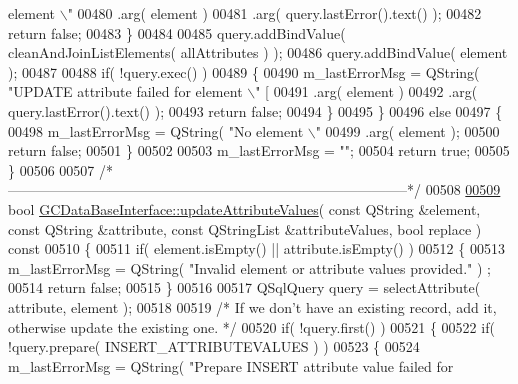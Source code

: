 \begin{DoxyCode}
{{{{{{{{{{{{{{{{{{{{       element \(\backslash\)"%
00480           .arg( element )
00481           .arg( query.lastError().text() );
00482       \textcolor{keywordflow}{return} \textcolor{keyword}{false};
00483     \}
00484 
00485     query.addBindValue( cleanAndJoinListElements( allAttributes ) );
00486     query.addBindValue( element );
00487 
00488     \textcolor{keywordflow}{if}( !query.exec() )
00489     \{
00490       m\_lastErrorMsg = QString( \textcolor{stringliteral}{"UPDATE attribute failed for element \(\backslash\)"%
       [%
00491           .arg( element )
00492           .arg( query.lastError().text() );
00493       \textcolor{keywordflow}{return} \textcolor{keyword}{false};
00494     \}
00495   \}
00496   \textcolor{keywordflow}{else}
00497   \{
00498     m\_lastErrorMsg = QString( \textcolor{stringliteral}{"No element \(\backslash\)"%
00499         .arg( element );
00500     \textcolor{keywordflow}{return} \textcolor{keyword}{false};
00501   \}
00502 
00503   m\_lastErrorMsg = \textcolor{stringliteral}{""};
00504   \textcolor{keywordflow}{return} \textcolor{keyword}{true};
00505 \}
00506 
00507 \textcolor{comment}{/*
      --------------------------------------------------------------------------------------*/}
00508 
\hypertarget{gcdatabaseinterface_8cpp_source_l00509}{}\hyperlink{class_g_c_data_base_interface_ae4f158875b5a8a109d301f19ce5d21ae}{00509} \textcolor{keywordtype}{bool} \hyperlink{class_g_c_data_base_interface_ae4f158875b5a8a109d301f19ce5d21ae}{GCDataBaseInterface::updateAttributeValues}( \textcolor{keyword}{const} QString &element, \textcolor{keyword}{const} 
      QString &attribute, \textcolor{keyword}{const} QStringList &attributeValues, \textcolor{keywordtype}{bool} replace )\textcolor{keyword}{ const}
00510 \textcolor{keyword}{}\{
00511   \textcolor{keywordflow}{if}( element.isEmpty() || attribute.isEmpty() )
00512   \{
00513     m\_lastErrorMsg = QString( \textcolor{stringliteral}{"Invalid element or attribute values provided."} )
      ;
00514     \textcolor{keywordflow}{return} \textcolor{keyword}{false};
00515   \}
00516 
00517   QSqlQuery query = selectAttribute( attribute, element );
00518 
00519   \textcolor{comment}{/* If we don't have an existing record, add it, otherwise update the existing
       one. */}
00520   \textcolor{keywordflow}{if}( !query.first() )
00521   \{
00522     \textcolor{keywordflow}{if}( !query.prepare( INSERT\_ATTRIBUTEVALUES ) )
00523     \{
00524       m\_lastErrorMsg = QString( \textcolor{stringliteral}{"Prepare INSERT attribute value failed for
}}}}}}}}}}}}}}}}}}}}}}}
\end{DoxyCode}
